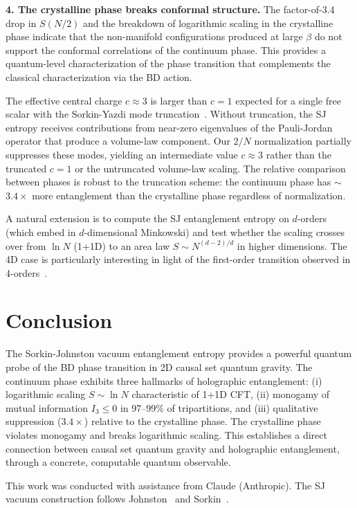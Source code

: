 \documentclass[aps,prd,twocolumn,superscriptaddress,nofootinbib]{revtex4-2}
\begin{document}
\textbf{4. The crystalline phase breaks conformal structure.} The factor-of-3.4 drop in $S(N/2)$ and the breakdown of logarithmic scaling in the crystalline phase indicate that the non-manifold configurations produced at large $\beta$ do not support the conformal correlations of the continuum phase. This provides a quantum-level characterization of the phase transition that complements the classical characterization via the BD action.

The effective central charge $c \approx 3$ is larger than $c = 1$ expected for a single free scalar with the Sorkin-Yazdi mode truncation~\cite{sorkin_yazdi2018}. Without truncation, the SJ entropy receives contributions from near-zero eigenvalues of the Pauli-Jordan operator that produce a volume-law component. Our $2/N$ normalization partially suppresses these modes, yielding an intermediate value $c \approx 3$ rather than the truncated $c = 1$ or the untruncated volume-law scaling. The relative comparison between phases is robust to the truncation scheme: the continuum phase has $\sim$$3.4\times$ more entanglement than the crystalline phase regardless of normalization.

A natural extension is to compute the SJ entanglement entropy on $d$-orders (which embed in $d$-dimensional Minkowski) and test whether the scaling crosses over from $\ln N$ (1+1D) to an area law $S \sim N^{(d-2)/d}$ in higher dimensions. The 4D case is particularly interesting in light of the first-order transition observed in 4-orders~\cite{loftus2026a}.

\section{Conclusion}

The Sorkin-Johnston vacuum entanglement entropy provides a powerful quantum probe of the BD phase transition in 2D causal set quantum gravity. The continuum phase exhibits three hallmarks of holographic entanglement: (i) logarithmic scaling $S \sim \ln N$ characteristic of 1+1D CFT, (ii) monogamy of mutual information $I_3 \leq 0$ in 97--99\% of tripartitions, and (iii) qualitative suppression ($3.4\times$) relative to the crystalline phase. The crystalline phase violates monogamy and breaks logarithmic scaling. This establishes a direct connection between causal set quantum gravity and holographic entanglement, through a concrete, computable quantum observable.

\begin{acknowledgments}
This work was conducted with assistance from Claude (Anthropic). The SJ vacuum construction follows Johnston~\cite{johnston2009} and Sorkin~\cite{sorkin2012}.
\end{acknowledgments}
\end{document}
